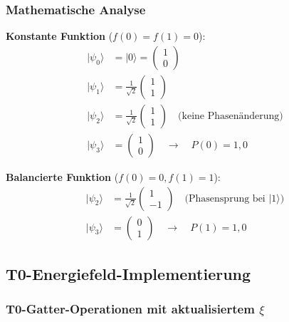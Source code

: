 	\subsubsection{Mathematische Analyse}
	
	\textbf{Konstante Funktion} ($f(0) = f(1) = 0$):
	\begin{align}
		|\psi_0\rangle &= |0\rangle = \begin{pmatrix} 1 \\ 0 \end{pmatrix} \\
		|\psi_1\rangle &= \frac{1}{\sqrt{2}}\begin{pmatrix} 1 \\ 1 \end{pmatrix} \\
		|\psi_2\rangle &= \frac{1}{\sqrt{2}}\begin{pmatrix} 1 \\ 1 \end{pmatrix} \quad \text{(keine Phasenänderung)} \\
		|\psi_3\rangle &= \begin{pmatrix} 1 \\ 0 \end{pmatrix} \quad \rightarrow \quad P(0) = 1,0
	\end{align}
	
	\textbf{Balancierte Funktion} ($f(0) = 0, f(1) = 1$):
	\begin{align}
		|\psi_2\rangle &= \frac{1}{\sqrt{2}}\begin{pmatrix} 1 \\ -1 \end{pmatrix} \quad \text{(Phasensprung bei } |1\rangle\text{)} \\
		|\psi_3\rangle &= \begin{pmatrix} 0 \\ 1 \end{pmatrix} \quad \rightarrow \quad P(1) = 1,0
	\end{align}
	
	\subsection{T0-Energiefeld-Implementierung}
	
	\subsubsection{T0-Gatter-Operationen mit aktualisiertem $\xi$}
	
